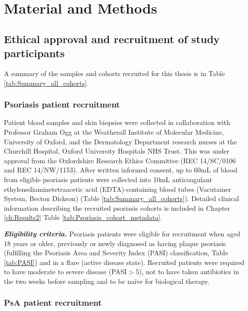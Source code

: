 \chapter{Material and Methods}
\label{ch:Mat}



\section{Ethical approval and recruitment of study participants}
A summary of the samples and cohorts recruited for this thesis is in Table \ref{tab:Summary_all_cohorts}.

\subsection{Psoriasis patient recruitment}

Patient blood samples and skin biopsies were collected in collaboration with Professor Graham Ogg at the Weatherall Institute of Molecular Medicine, University of Oxford, and the Dermatology Department research nurses at the Churchill Hospital, Oxford University Hospitals NHS Trust. This was under approval from the Oxfordshire Research Ethics Committee (REC 14/SC/0106 and REC 14/NW/1153). After written informed consent, up to 60mL of blood from eligible psoriasis patients were collected into 10mL anticoagulant ethylenediaminetetraacetic acid (EDTA)-containing blood tubes (Vacutainer System, Becton Dickson) (Table \ref{tab:Summary_all_cohorts}). Detailed clinical information describing the recruited psoriasis cohorts is included in Chapter \ref{ch:Results2} Table \ref{tab:Psoriasis_cohort_metadata}.

\textit{\textbf{Eligibility criteria.}} Psoriasis patients were eligible for recruitment when aged 18 years or older, previously or newly diagnosed as having plaque psoriasis (fulfilling the Psoriasis Area and Severity Index (PASI) classification, Table \ref{tab:PASI}) and in a flare (active disease state). Recruited patients were required to have moderate to severe disease (PASI$>$5), not to have taken antibiotics in the two weeks before sampling and to be na\"{i}ve for biological therapy. 



\subsection{PsA patient recruitment}

